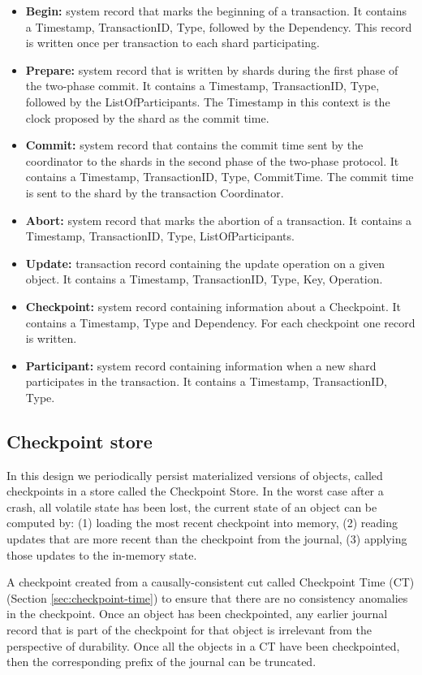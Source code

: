 \documentclass[twoside]{article}
\begin{document}
\begin{itemize}
\item \textbf{Begin:} system record that marks the beginning of a
transaction. 
It contains a Timestamp, TransactionID, Type, followed by the Dependency.
This record is written once per transaction to each shard
participating.
\item \textbf{Prepare:} system record that is written by shards during the first phase 
of the two-phase commit. 
It contains a Timestamp, TransactionID, Type, followed by the ListOfParticipants.
The Timestamp in this context is the clock proposed by the shard as the commit time.
\item \textbf{Commit:} system record that contains the commit time sent by the coordinator
to the shards in the second phase of the two-phase protocol.
It contains a Timestamp, TransactionID, Type, CommitTime.
The commit time is sent to the shard by the transaction Coordinator.
\item \textbf{Abort:} system record that marks the abortion of a transaction.
It contains a Timestamp, TransactionID, Type, ListOfParticipants.
\item \textbf{Update:} transaction record containing the update operation on a given
object.
It contains a Timestamp, TransactionID, Type, Key, Operation.
\item \textbf{Checkpoint:} system record containing information about a Checkpoint.
It contains a Timestamp, Type and Dependency. 
For each checkpoint one record is written.
\item \textbf{Participant:} system record containing information when a new shard 
participates in the transaction.
It contains a Timestamp, TransactionID, Type.
\end{itemize}


\subsection{Checkpoint store}
\label{sec:checkpoint-store}

In this design we periodically persist materialized versions of objects, called
checkpoints in a store called the Checkpoint Store.  
In the worst case after a crash, all volatile state has been lost, the current
state of an object can be computed by: (1) loading the most recent checkpoint
into memory, (2) reading updates that are more recent than the checkpoint from
the journal, (3) applying those updates to the in-memory state.

A checkpoint created from a causally-consistent cut called Checkpoint Time
(CT) (Section \ref{sec:checkpoint-time}) to ensure that there are no consistency
anomalies in the checkpoint.
Once an object has been checkpointed, any earlier journal record that is part of 
the checkpoint for that object is irrelevant from the perspective of durability. 
Once all the objects in a CT have been checkpointed, then the corresponding
prefix of the journal can be truncated.
\end{document}
